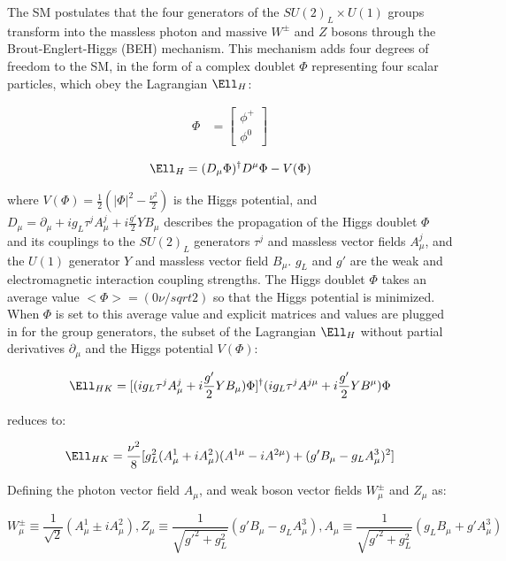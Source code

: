 The SM postulates that the four generators of the $SU(2)_{L} \times U(1)$ groups transform into the massless 
photon and massive $W^{\pm}$ and $Z$ bosons through the Brout-Englert-Higgs (BEH) mechanism.  This mechanism 
adds four degrees of freedom to the SM, in the form of a complex doublet $\Phi$ representing four scalar 
particles, which obey the Lagrangian $\Ell_{H}$:

\begin{align}
	\Phi &= \begin{bmatrix}
	\phi^{+} \\
	\phi^{0}
	\end{bmatrix}
\end{align}

\begin{equation}
	\Ell_{H} = (D_{\mu}\Phi)^{\dagger}D^{\mu}\Phi - V(\Phi)
\end{equation}

where $V(\Phi) = \frac{1}{2}(|\Phi|^{2} - \frac{\nu^{2}}{2})$ is the Higgs potential, and 
$D_{\mu} = \partial_{\mu} + ig_{L}\tau^{j}A^{j}_{\mu} + i\frac{g'}{2}YB_{\mu}$ describes the propagation 
of the Higgs doublet $\Phi$ and its couplings to the $SU(2)_L$ generators $\tau^{j}$ and massless vector 
fields $A^{j}_{\mu}$, and the $U(1)$ generator $Y$ and massless vector field $B_{\mu}$.  $g_{L}$ and 
$g'$ are the weak and electromagnetic interaction coupling strengths.  The Higgs doublet $\Phi$ takes an 
average value $<\Phi> = (0  \nu/sqrt{2})$ so that the Higgs potential is minimized.  When $\Phi$ is set 
to this average value and explicit matrices and values are plugged in for the group generators, the subset 
of the Lagrangian $\Ell_{H}$ without partial derivatives $\partial_{\mu}$ and the Higgs potential $V(\Phi)$:

\begin{equation}
	\Ell_{HK} = [(ig_{L}\tau^{j}A^{j}_{\mu} + i\frac{g'}{2}YB_{\mu})\Phi]^{\dagger}(ig_{L}\tau^{j}A^{j\mu} + i\frac{g'}{2}YB^{\mu})\Phi
\end{equation}

reduces to:

\begin{equation}
	\Ell_{HK} = \frac{\nu^{2}}{8}[g^{2}_{L}(A^{1}_{\mu} + iA^{2}_{\mu})(A^{1\mu} - iA^{2\mu}) + (g'B_{\mu} - g_{L}A^{3}_{\mu})^{2}]
\end{equation}

Defining the photon vector field $A_{\mu}$, and weak boson vector fields $W^{\pm}_{\mu}$ and $Z_{\mu}$ as:

\begin{equation}
	W^{\pm}_{\mu} \equiv \frac{1}{\sqrt{2}}(A^{1}_{\mu} \pm iA^{2}_{\mu}), 
	Z_{\mu} \equiv \frac{1}{\sqrt{g'^{2} + g^{2}_{L}}}(g'B_{\mu} - g_{L}A^{3}_{\mu}), 
	A_{\mu} \equiv \frac{1}{\sqrt{g'^{2} + g^{2}_{L}}}(g_{L}B_{\mu} + g'A^{3}_{\mu})
\end{equation}

